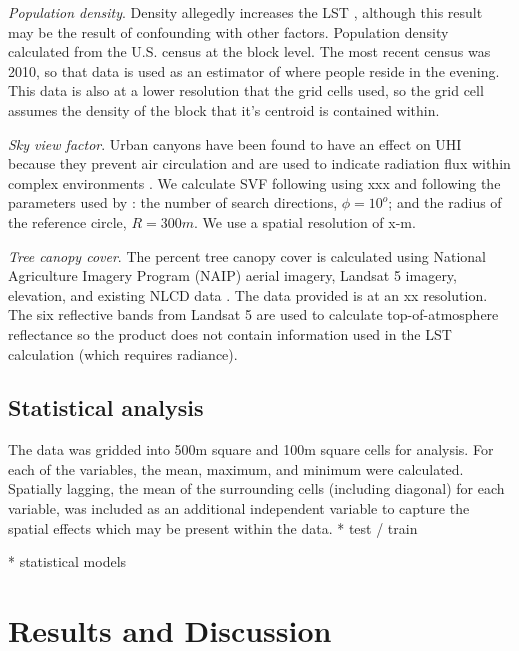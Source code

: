 \documentclass[final,3p,times,twocolumn,sort&compress]{elsarticle}
\begin{document}
\textit{Population density}. Density allegedly increases the LST \cite{Li2017-yl}, although this result may be the result of confounding with other factors. Population density calculated from the U.S. census at the block level. The most recent census was 2010, so that data is used as an estimator of where people reside in the evening. This data is also at a lower resolution that the grid cells used, so the grid cell assumes the density of the block that it's centroid is contained within.

\textit{Sky view factor}. Urban canyons have been found to have an effect on UHI because they prevent air circulation \cite{Landsberg1981, Chun2017-mm} and are used to indicate radiation flux within complex environments \cite{Matzarakis2007-xy}. We calculate SVF following using xxx and following the parameters used by \cite{Chun2017-mm}: the number of search directions, $\phi=10^o$; and the radius of the reference circle, $R=300m$. We use a spatial resolution of x-m.

\textit{Tree canopy cover}. The percent tree canopy cover is calculated using National Agriculture Imagery Program (NAIP) aerial imagery, Landsat 5 imagery, elevation, and existing NLCD data \cite{Coulston2012-uu, Homer2015-ce}. The data provided is at an xx resolution. The six reflective bands from Landsat 5 are used to calculate top-of-atmosphere reflectance \cite{Coulston2012-uu} so the product does not contain information used in the LST calculation (which requires radiance). 

\subsection{Statistical analysis}
The data was gridded into 500m square and 100m square cells for analysis. For each of the variables, the mean, maximum, and minimum were calculated. Spatially lagging, the mean of the surrounding cells (including diagonal) for each variable, was included as an additional independent variable to capture the spatial effects which may be present within the data. 
* test / train

* statistical models

\section{Results and Discussion}
\end{document}
